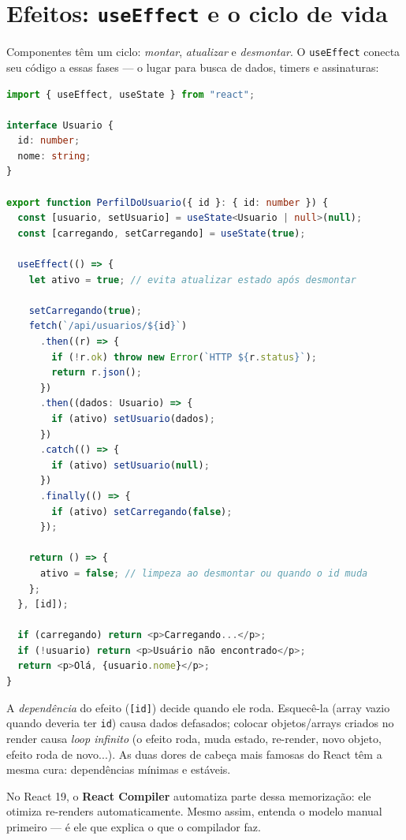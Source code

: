 \section{Efeitos: \texttt{useEffect} e o ciclo de vida}

Componentes têm um ciclo: \emph{montar}, \emph{atualizar} e \emph{desmontar}.
O \texttt{useEffect} conecta seu código a essas fases — o lugar para busca de
dados, timers e assinaturas:

\begin{lstlisting}[style=livro, language=TypeScript,
  caption={Efeitos: busca de dados e limpeza.}, label={list:react-efeito}]
import { useEffect, useState } from "react";

interface Usuario {
  id: number;
  nome: string;
}

export function PerfilDoUsuario({ id }: { id: number }) {
  const [usuario, setUsuario] = useState<Usuario | null>(null);
  const [carregando, setCarregando] = useState(true);

  useEffect(() => {
    let ativo = true; // evita atualizar estado após desmontar

    setCarregando(true);
    fetch(`/api/usuarios/${id}`)
      .then((r) => {
        if (!r.ok) throw new Error(`HTTP ${r.status}`);
        return r.json();
      })
      .then((dados: Usuario) => {
        if (ativo) setUsuario(dados);
      })
      .catch(() => {
        if (ativo) setUsuario(null);
      })
      .finally(() => {
        if (ativo) setCarregando(false);
      });

    return () => {
      ativo = false; // limpeza ao desmontar ou quando o id muda
    };
  }, [id]);

  if (carregando) return <p>Carregando...</p>;
  if (!usuario) return <p>Usuário não encontrado</p>;
  return <p>Olá, {usuario.nome}</p>;
}
\end{lstlisting}

\begin{caixaarmadilha}
A \emph{dependência} do efeito (\texttt{[id]}) decide quando ele roda.
Esquecê-la (array vazio quando deveria ter \texttt{id}) causa dados defasados;
colocar objetos/arrays criados no render causa \emph{loop infinito} (o efeito
roda, muda estado, re-render, novo objeto, efeito roda de novo...). As duas
dores de cabeça mais famosas do React têm a mesma cura: dependências mínimas e
estáveis.
\end{caixaarmadilha}

\begin{caixadica}
No React 19, o \textbf{React Compiler} automatiza parte dessa memorização: ele
otimiza re-renders automaticamente. Mesmo assim, entenda o modelo manual
primeiro — é ele que explica o que o compilador faz.
\end{caixadica}

